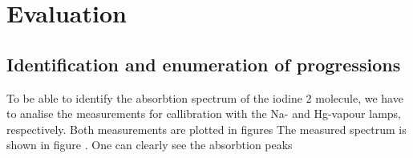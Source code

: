 \section{Evaluation}

\subsection{Identification and enumeration of progressions}
To be able to identify the absorbtion spectrum of the iodine 2 molecule, we have to analise 
the measurements for callibration with the Na- and Hg-vapour lamps, respectively. Both 
measurements are plotted in figures 
The measured spectrum is shown in figure . One can clearly see the 
absorbtion peaks 
